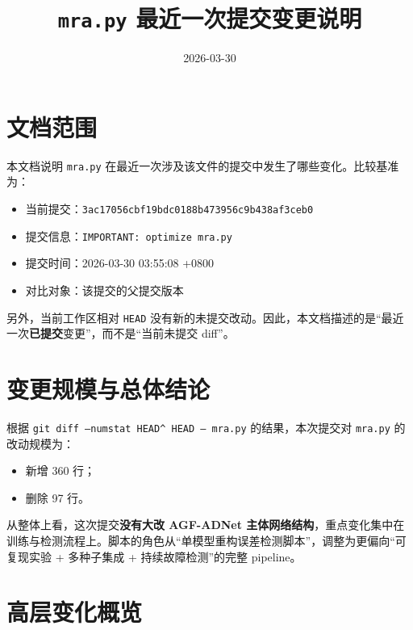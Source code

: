 \documentclass[UTF8]{ctexart}
\title{\texttt{mra.py} 最近一次提交变更说明}
\author{}
\date{2026-03-30}
\begin{document}
\maketitle

\section{文档范围}

本文档说明 \texttt{mra.py} 在最近一次涉及该文件的提交中发生了哪些变化。比较基准为：
\begin{itemize}
    \item 当前提交：\texttt{3ac17056cbf19bdc0188b473956c9b438af3ceb0}
    \item 提交信息：\texttt{IMPORTANT: optimize mra.py}
    \item 提交时间：2026-03-30 03:55:08 +0800
    \item 对比对象：该提交的父提交版本
\end{itemize}

另外，当前工作区相对 \texttt{HEAD} 没有新的未提交改动。因此，本文档描述的是“最近一次\textbf{已提交}变更”，而不是“当前未提交 diff”。

\section{变更规模与总体结论}

根据 \texttt{git diff --numstat HEAD\^{} HEAD -- mra.py} 的结果，本次提交对 \texttt{mra.py} 的改动规模为：
\begin{itemize}
    \item 新增 360 行；
    \item 删除 97 行。
\end{itemize}

从整体上看，这次提交\textbf{没有大改 AGF-ADNet 主体网络结构}，重点变化集中在训练与检测流程上。脚本的角色从“单模型重构误差检测脚本”，调整为更偏向“可复现实验 + 多种子集成 + 持续故障检测”的完整 pipeline。

\section{高层变化概览}
\end{document}
